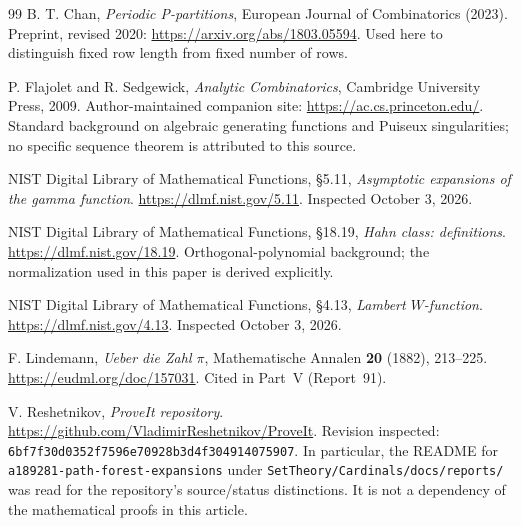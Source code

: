 \documentclass[11pt,letterpaper]{article}
\numberwithin{equation}{section}
\theoremstyle{definition}
\newcommand{\1}{\mathbf 1}
\begin{document}
\begin{thebibliography}{99}
 B. T. Chan, \emph{Periodic P-partitions},
European Journal of Combinatorics (2023).
Preprint, revised 2020: \url{https://arxiv.org/abs/1803.05594}.
Used here to distinguish fixed row length from fixed number of rows.

 P. Flajolet and R. Sedgewick,
\emph{Analytic Combinatorics}, Cambridge University Press, 2009.
Author-maintained companion site: \url{https://ac.cs.princeton.edu/}.
Standard background on algebraic generating functions and Puiseux
singularities; no specific sequence theorem is attributed to this source.

 NIST Digital Library of Mathematical Functions,
\S5.11, \emph{Asymptotic expansions of the gamma function}.
\url{https://dlmf.nist.gov/5.11}. Inspected October 3, 2026.

 NIST Digital Library of Mathematical Functions,
\S18.19, \emph{Hahn class: definitions}.
\url{https://dlmf.nist.gov/18.19}. Orthogonal-polynomial background;
the normalization used in this paper is derived explicitly.

 NIST Digital Library of Mathematical Functions,
\S4.13, \emph{Lambert $W$-function}.
\url{https://dlmf.nist.gov/4.13}. Inspected October 3, 2026.

 F. Lindemann, \emph{Ueber die Zahl $\pi$},
Mathematische Annalen \textbf{20} (1882), 213--225.
\url{https://eudml.org/doc/157031}. Cited in Part~V (Report~91).

 V. Reshetnikov, \emph{ProveIt repository}.
\url{https://github.com/VladimirReshetnikov/ProveIt}.
Revision inspected: \texttt{6bf7f30d0352f7596e70928b3d4f304914075907}.
In particular, the README for
\texttt{a189281-path-forest-expansions} under
\texttt{SetTheory/Cardinals/docs/reports/} was read for the repository's
source/status distinctions. It is not a dependency of the mathematical
proofs in this article.
\end{thebibliography}
\end{document}
